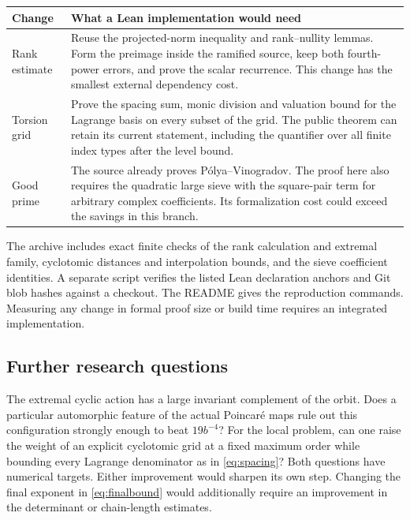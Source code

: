 \begin{center}\small
\begin{tabularx}{\linewidth}{@{}p{.17\linewidth}X@{}}
\toprule
\textbf{Change}&\textbf{What a Lean implementation would need}\\\midrule
Rank estimate&
Reuse the projected-norm inequality and rank--nullity lemmas. Form the preimage inside the ramified source, keep both fourth-power errors, and prove the scalar recurrence. This change has the smallest external dependency cost.\\
Torsion grid&
Prove the spacing sum, monic division and valuation bound for the Lagrange basis on every subset of the grid. The public theorem can retain its current statement, including the quantifier over all finite index types after the level bound.\\
Good prime&
The source already proves P\'olya--Vinogradov. The proof here also requires the quadratic large sieve with the square-pair term for arbitrary complex coefficients. Its formalization cost could exceed the savings in this branch.\\\bottomrule
\end{tabularx}
\end{center}
The archive includes exact finite checks of the rank calculation and extremal family, cyclotomic distances and interpolation bounds, and the sieve coefficient identities. A separate script verifies the listed Lean declaration anchors and Git blob hashes against a checkout. The README gives the reproduction commands. Measuring any change in formal proof size or build time requires an integrated implementation.

\subsection*{Further research questions}
The extremal cyclic action has a large invariant complement of the orbit. Does a particular automorphic feature of the actual Poincar\'e maps rule out this configuration strongly enough to beat $19b^{-4}$? For the local problem, can one raise the weight of an explicit cyclotomic grid at a fixed maximum order while bounding every Lagrange denominator as in \eqref{eq:spacing}? Both questions have numerical targets. Either improvement would sharpen its own step. Changing the final exponent in \eqref{eq:finalbound} would additionally require an improvement in the determinant or chain-length estimates.

